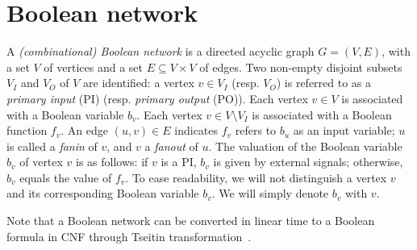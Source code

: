 \section{Boolean network}
\label{sect:boolean-network}

A \textit{(combinational) Boolean network} is a directed acyclic graph $G=(V,E)$,
with a set $V$ of vertices and a set $E\subseteq V \times V$ of edges.
Two non-empty disjoint subsets $V_I$ and $V_O$ of $V$ are identified:
a vertex $v \in V_I$ (resp. $V_O$) is referred to as a \textit{primary input} (PI) (resp. \textit{primary output} (PO)).
Each vertex $v \in V$ is associated with a Boolean variable $b_v$.
Each vertex $v \in V \setminus V_I$ is associated with a Boolean function $f_v$.
An edge $(u,v)\in E$ indicates $f_v$ refers to $b_u$ as an input variable;
$u$ is called a \textit{fanin} of $v$, and $v$ a \textit{fanout} of $u$.
The valuation of the Boolean variable $b_v$ of vertex $v$ is as follows:
if $v$ is a PI, $b_v$ is given by external signals; otherwise, $b_v$ equals the value of $f_v$.
To ease readability, we will not distinguish a vertex $v$ and its corresponding Boolean variable $b_v$.
We will simply denote $b_v$ with $v$.

Note that a Boolean network can be converted in linear time to a Boolean formula in CNF through Tseitin transformation~\cite{Tseitin1983}.